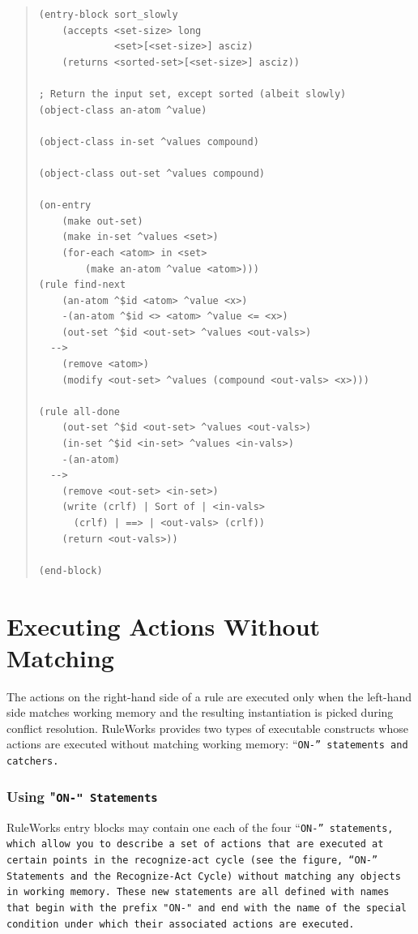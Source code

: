 \begin{quote}
\begin{verbatim}
(entry-block sort_slowly
    (accepts <set-size> long
             <set>[<set-size>] asciz)
    (returns <sorted-set>[<set-size>] asciz))

; Return the input set, except sorted (albeit slowly)
(object-class an-atom ^value)

(object-class in-set ^values compound)

(object-class out-set ^values compound)

(on-entry
    (make out-set)
    (make in-set ^values <set>)
    (for-each <atom> in <set>
        (make an-atom ^value <atom>)))
(rule find-next
    (an-atom ^$id <atom> ^value <x>)
    -(an-atom ^$id <> <atom> ^value <= <x>)
    (out-set ^$id <out-set> ^values <out-vals>)
  -->
    (remove <atom>)
    (modify <out-set> ^values (compound <out-vals> <x>)))

(rule all-done
    (out-set ^$id <out-set> ^values <out-vals>)
    (in-set ^$id <in-set> ^values <in-vals>)
    -(an-atom)
  -->
    (remove <out-set> <in-set>)
    (write (crlf) | Sort of | <in-vals>
      (crlf) | ==> | <out-vals> (crlf))
    (return <out-vals>))

(end-block)
\end{verbatim}
\end{quote}

\section{Executing Actions Without Matching}

The actions on the right-hand side of a rule are executed only when
the left-hand side matches working memory and the resulting
instantiation is picked during conflict resolution. RuleWorks provides
two types of executable constructs whose actions are executed without
matching working memory: ``\tt{ON-}'' statements and catchers.

\subsubsection*{Using "\tt{ON-}" Statements}

RuleWorks entry blocks may contain one each of the four ``\tt{ON-}''
statements, which allow you to describe a set of actions that are
executed at certain points in the recognize-act cycle (see the figure,
``\tt{ON-}'' Statements and the Recognize-Act Cycle) without matching
any objects in working memory. These new statements are all defined
with names that begin with the prefix "\tt{ON-}" and end with the name
of the special condition under which their associated actions are
executed.

